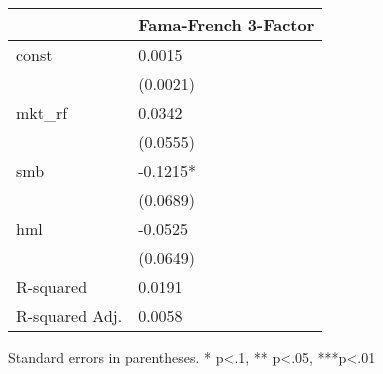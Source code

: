 \begin{table}
\caption{}
\label{}
\begin{center}
\begin{tabular}{ll}
\hline
               & Fama-French 3-Factor  \\
\hline
const          & 0.0015                \\
               & (0.0021)              \\
mkt\_rf        & 0.0342                \\
               & (0.0555)              \\
smb            & -0.1215*              \\
               & (0.0689)              \\
hml            & -0.0525               \\
               & (0.0649)              \\
R-squared      & 0.0191                \\
R-squared Adj. & 0.0058                \\
\hline
\end{tabular}
\end{center}
\end{table}
\bigskip
Standard errors in parentheses. \newline 
* p<.1, ** p<.05, ***p<.01
